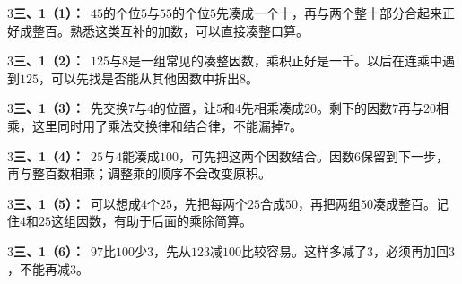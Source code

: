 \documentclass[multi=snippet,border={5bp 20bp 5bp 5bp}]{standalone}
\newenvironment{snippet}[3]{\begin{minipage}{#1bp}\color{answerred}\fontsize{#2}{#3}\selectfont\raggedright}{\end{minipage}}
\begin{document}
\begin{snippet}{505}{11.5}{14}\begin{multicols}{3}\raggedcolumns \textbf{三、1（1）：}\ \(45\)\allowbreak 的个位\(5\)\allowbreak 与\(55\)\allowbreak 的个位\(5\)\allowbreak 先凑成一个十，再与两个整十部分合起来正好成整百。熟悉这类互补的加数，可以直接凑整口算。\end{multicols}\end{snippet}
\begin{snippet}{505}{11.5}{14}\begin{multicols}{3}\raggedcolumns \textbf{三、1（2）：}\ \(125\)\allowbreak 与\(8\)\allowbreak 是一组常见的凑整因数，乘积正好是一千。以后在连乘中遇到\(125\)\allowbreak ，可以先找是否能从其他因数中拆出\(8\)\allowbreak 。\end{multicols}\end{snippet}
\begin{snippet}{505}{11.5}{14}\begin{multicols}{3}\raggedcolumns \textbf{三、1（3）：}\ 先交换\(7\)\allowbreak 与\(4\)\allowbreak 的位置，让\(5\)\allowbreak 和\(4\)\allowbreak 先相乘凑成\(20\)\allowbreak 。剩下的因数\(7\)\allowbreak 再与\(20\)\allowbreak 相乘，这里同时用了乘法交换律和结合律，不能漏掉\(7\)\allowbreak 。\end{multicols}\end{snippet}
\begin{snippet}{505}{11.5}{14}\begin{multicols}{3}\raggedcolumns \textbf{三、1（4）：}\ \(25\)\allowbreak 与\(4\)\allowbreak 能凑成\(100\)\allowbreak ，可先把这两个因数结合。因数\(6\)\allowbreak 保留到下一步，再与整百数相乘；调整乘的顺序不会改变原积。\end{multicols}\end{snippet}
\begin{snippet}{505}{11.5}{14}\begin{multicols}{3}\raggedcolumns \textbf{三、1（5）：}\ 可以想成\(4\)\allowbreak 个\(25\)\allowbreak ，先把每两个\(25\)\allowbreak 合成\(50\)\allowbreak ，再把两组\(50\)\allowbreak 凑成整百。记住\(4\)\allowbreak 和\(25\)\allowbreak 这组因数，有助于后面的乘除简算。\end{multicols}\end{snippet}
\begin{snippet}{505}{11.5}{14}\begin{multicols}{3}\raggedcolumns \textbf{三、1（6）：}\ \(97\)\allowbreak 比\(100\)\allowbreak 少\(3\)\allowbreak ，先从\(123\)\allowbreak 减\(100\)\allowbreak 比较容易。这样多减了\(3\)\allowbreak ，必须再加回\(3\)\allowbreak ，不能再减\(3\)\allowbreak 。\end{multicols}\end{snippet}
\end{document}
